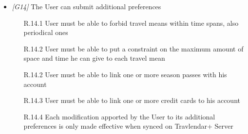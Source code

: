 \begin{itemize}
\item \textit{[G14]} The User can submit additional preferences
		 \begin{itemize}
		 	\item[R.14.1] User must be able to forbid travel means within time spans, also periodical ones
			\item[R.14.2] User must be able to put a constraint on the maximum amount of space and time he can give to each travel mean
			\item[R.14.2] User must be able to link one or more season passes with his account
			\item[R.14.3] User must be able to link one or more credit cards to his account
			\item[R.14.4] Each modification apported by the User to its additional preferences is only made effective when synced on Travlendar+ Server 
				

            	\end{itemize}
		
\end{itemize}
            
\vfill
